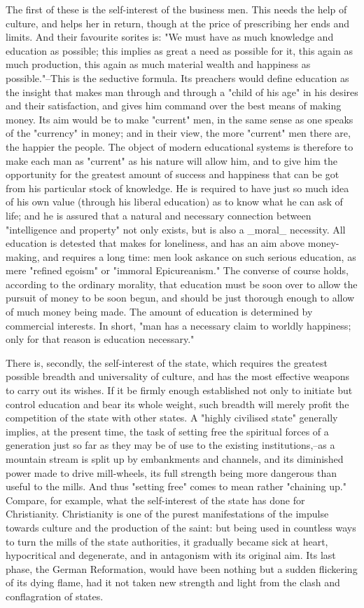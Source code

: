 The first of these is the self-interest of the business men. This
needs the help of culture, and helps her in return, though at the
price of prescribing her ends and limits. And their favourite sorites
is: "We must have as much knowledge and education as possible; this
implies as great a need as possible for it, this again as much
production, this again as much material wealth and happiness as
possible."--This is the seductive formula. Its preachers would define
education as the insight that makes man through and through a "child
of his age" in his desires and their satisfaction, and gives him
command over the best means of making money. Its aim would be to make
"current" men, in the same sense as one speaks of the "currency" in
money; and in their view, the more "current" men there are, the
happier the people. The object of modern educational systems is
therefore to make each man as "current" as his nature will allow him,
and to give him the opportunity for the greatest amount of success
and happiness that can be got from his particular stock of knowledge.
He is required to have just so much idea of his own value (through
his liberal education) as to know what he can ask of life; and he is
assured that a natural and necessary connection between "intelligence
and property" not only exists, but is also a _moral_ necessity. All
education is detested that makes for loneliness, and has an aim above
money-making, and requires a long time: men look askance on such
serious education, as mere "refined egoism" or "immoral
Epicureanism." The converse of course holds, according to the
ordinary morality, that education must be soon over to allow the
pursuit of money to be soon begun, and should be just thorough enough
to allow of much money being made. The amount of education is
determined by commercial interests. In short, "man has a necessary
claim to worldly happiness; only for that reason is education
necessary."

There is, secondly, the self-interest of the state, which requires
the greatest possible breadth and universality of culture, and has
the most effective weapons to carry out its wishes. If it be firmly
enough established not only to initiate but control education and
bear its whole weight, such breadth will merely profit the
competition of the state with other states. A "highly civilised
state" generally implies, at the present time, the task of setting
free the spiritual forces of a generation just so far as they may be
of use to the existing institutions,--as a mountain stream is split
up by embankments and channels, and its diminished power made to
drive mill-wheels, its full strength being more dangerous than useful
to the mills. And thus "setting free" comes to mean rather "chaining
up." Compare, for example, what the self-interest of the state has
done for Christianity. Christianity is one of the purest
manifestations of the impulse towards culture and the production of
the saint: but being used in countless ways to turn the mills of the
state authorities, it gradually became sick at heart, hypocritical
and degenerate, and in antagonism with its original aim. Its last
phase, the German Reformation, would have been nothing but a sudden
flickering of its dying flame, had it not taken new strength and
light from the clash and conflagration of states.

